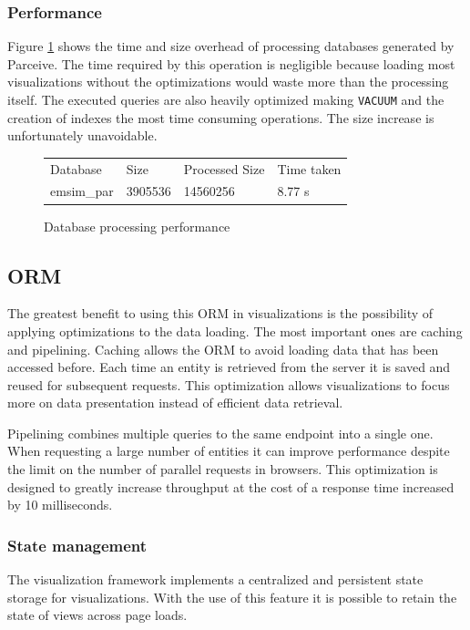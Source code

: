 \subsubsection*{Performance}

Figure \ref{parceive:procperformance} shows the time and size overhead of
processing databases generated by Parceive. The time required by this operation
is negligible because loading most visualizations without the optimizations
would waste more than the processing itself. The executed queries are also
heavily optimized making \texttt{VACUUM} and the creation of indexes the most
time consuming operations. The size increase is unfortunately unavoidable.

\begin{figure}
	\centering
	\begin{tabular}{l l l l}
		Database & Size & Processed Size & Time taken \\
		emsim\_par & 3905536 & 14560256 & 8.77 s
	\end{tabular}
	\caption{Database processing performance}
	\label{parceive:procperformance}
\end{figure}

\subsection{ORM}



The greatest benefit to using this ORM in visualizations is the possibility of
applying optimizations to the data loading. The most important ones are caching
and pipelining. Caching allows the ORM to avoid loading data that has been
accessed before. Each time an entity is retrieved from the server it is saved
and reused for subsequent requests. This optimization allows visualizations to
focus more on data presentation instead of efficient data retrieval.

Pipelining combines multiple queries to the same endpoint into a single one.
When requesting a large number of entities it can improve performance despite
the limit on the number of parallel requests in browsers. This optimization is
designed to greatly increase throughput at the cost of a response time
increased by 10 milliseconds.

\subsubsection{State management}

The visualization framework implements a centralized and persistent state
storage for visualizations. With the use of this feature it is possible to
retain the state of views across page loads.

